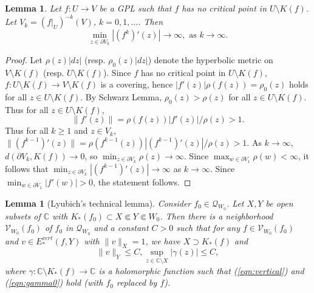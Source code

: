 \documentclass{amsart}
\numberwithin{equation}{section}
\newtheorem{lemma}[theorem]{Lemma}%
\newcommand{\C}{\mathbb C}
\theoremstyle{definition}
\theoremstyle{remark}
\begin{document}
\begin{lemma}\label{lem:expansion} Let $f:U\to V$ be a GPL such that $f$ has no critical point in $U\setminus K(f)$. Let $V_k=(f|_U)^{-k} (V)$, $k=0,1,\dots$. Then 
$$\min_{z\in \partial V_k} |(f^k)'(z)|\to\infty, \text{ as } k\to\infty.$$
\end{lemma}
\begin{proof} Let $\rho(z)|dz|$ (resp. $\rho_0(z)|dz|$) denote the hyperbolic metric on $V\setminus K(f)$ (resp. $U\setminus K(f)$). Since $f$ has no critical point in $U\setminus K(f)$, $f:U\setminus K(f)\to V\setminus K(f)$ is a covering, hence 
$|f'(z)|\rho(f(z))=\rho_0(z)$ holds for all $z\in U\setminus K(f)$. By Schwarz Lemma, 
$\rho_0(z)>\rho(z)$ for all $z\in U\setminus K(f)$. Thus for all $z\in U\setminus K(f)$, 
$$\|f'(z)\|=\rho (f(z))|f'(z)|/\rho(z)>1.$$
Thus for all $k\ge 1$ and $z\in V_k$, $\|(f^{k-1})'(z)\|=\rho(f^{k-1}(z))|(f^{k-1})'(z)|/\rho(z)>1.$ As $k\to\infty$, $d(\partial V_k, K(f))\to 0$, so $\min_{z\in \partial V_k}\rho(z)\to\infty$. Since $\max_{w\in \partial V_1}\rho(w)<\infty$, 
it follows that $\min_{z\in \partial V_k}|(f^{k-1})'(z)|\to\infty$ as $k\to\infty$. Since $\min_{w\in\partial V_1}|f'(w)|>0$, the statement follows. 
\end{proof}
\begin{lemma}[Lyubich's technical lemma]\label{lem:Lyutech}  Consider $f_0\in \mathcal{Q}_{W_0}$. Let $X, Y$ be open subsets of $\C$ with $K_*(f_0)\subset X\Subset Y\Subset W_0$. 
Then there is a neighborhood $\mathcal{V}_{W_0}(f_0)$ of $f_0$ in $\mathcal{Q}_{W_0}$ and a constant $C>0$ such that for any $f\in \mathcal{V}_{W_0}(f_0)$ and $v\in E^{vert}_*(f, Y)$ with $\|v\|_X=1$, we have $X\supset K_*(f)$ and 
$$\|v\|_{Y}\le C, \sup_{z\in \C\setminus X}|\gamma(z)|\le C,$$
where $\gamma:\mathbb{C}\setminus K_*(f)\to \mathbb{C}$ is a holomorphic function such that (\ref{eqn:vertical}) and (\ref{eqn:gamma0}) hold (with $f_0$ replaced by $f$).     
\end{lemma}
\end{document}
